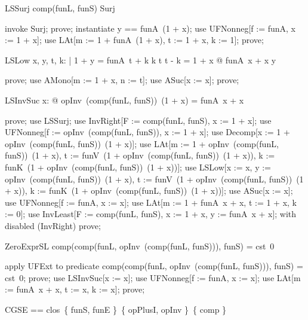 \documentclass{article}
\begin{document}
\begin{theorem}{LSSurj}
  comp(funL, funS) \in Surj
\end{theorem}

\begin{zproof}
invoke Surj;
prove;
instantiate y == funA~(1 + x);
use UFNonneg[f := funA, x := 1 + x];
use LAt[m := 1 + funA~(1 + x), t := 1 + x, k := 1];
prove;
\end{zproof}

\begin{theorem}{LSLow}
  \forall x, y, t, k: \nat | 1 + y = funA~t + k \land k \leq t \land t - k = 1 + x @ funA~x + x \leq y
\end{theorem}

\begin{zproof}
prove;
use AMono[m := 1 + x, n := t];
use ASuc[x := x];
prove;
\end{zproof}

\begin{theorem}{LSInvSuc}
  \forall x: \nat @ opInv~(comp(funL, funS))~(1 + x) = funA~x + x
\end{theorem}

\begin{zproof}
prove;
use LSSurj;
use InvRight[F := comp(funL, funS), x := 1 + x];
use UFNonneg[f := opInv~(comp(funL, funS)), x := 1 + x];
use Decomp[x := 1 + opInv~(comp(funL, funS))~(1 + x)];
use LAt[m := 1 + opInv~(comp(funL, funS))~(1 + x), t := funV~(1 + opInv~(comp(funL, funS))~(1 + x)), k := funK~(1 + opInv~(comp(funL, funS))~(1 + x))];
use LSLow[x := x, y := opInv~(comp(funL, funS))~(1 + x), t := funV~(1 + opInv~(comp(funL, funS))~(1 + x)), k := funK~(1 + opInv~(comp(funL, funS))~(1 + x))];
use ASuc[x := x];
use UFNonneg[f := funA, x := x];
use LAt[m := 1 + funA~x + x, t := 1 + x, k := 0];
use InvLeast[F := comp(funL, funS), x := 1 + x, y := funA~x + x];
with disabled (InvRight) prove;
\end{zproof}

\begin{theorem}{ZeroExprSL}
  comp(comp(funL, opInv~(comp(funL, funS))), funS) = cst~0
\end{theorem}

\begin{zproof}
apply UFExt to predicate comp(comp(funL, opInv~(comp(funL, funS))), funS) = cst~0;
prove;
use LSInvSuc[x := x];
use UFNonneg[f := funA, x := x];
use LAt[m := funA~x + x, t := x, k := x];
prove;
\end{zproof}

\begin{zed}
  CGSE == clos~\{ funS, funE \}~\{ opPlusI, opInv \}~\{ comp \}
\end{zed}
\end{document}
